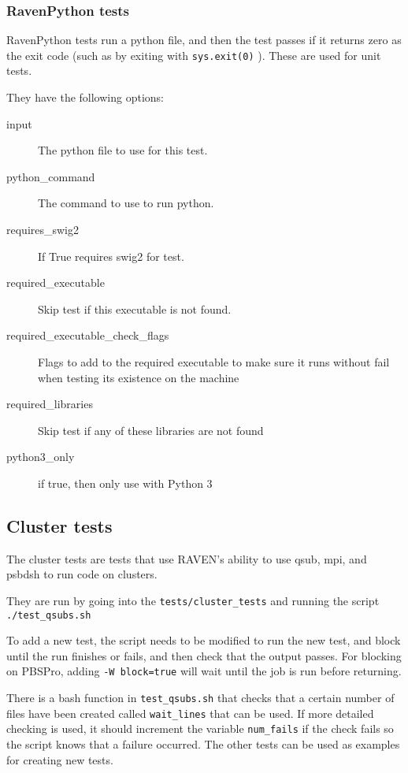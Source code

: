 \documentclass{article}
\begin{document}
\subsubsection{RavenPython tests}

RavenPython tests run a python file, and then the test passes if it
returns zero as the exit code (such as by exiting with
\verb'sys.exit(0)' ).  These are used for unit tests.

They have the following options:

\begin{description}
\item[input] The python file to use for this test.
\item[python\_command] The command to use to run python.
\item[requires\_swig2] If True requires swig2 for test.
\item[required\_executable] Skip test if this executable is not found.
\item[required\_executable\_check\_flags] Flags to add to the required executable to make sure it runs without fail when testing its existence on the machine
\item[required\_libraries] Skip test if any of these libraries are not found
\item[python3\_only] if true, then only use with Python 3
\end{description}

\subsection{Cluster tests}


The cluster tests are tests that use RAVEN's ability to use qsub, mpi,
and psbdsh to run code on clusters.

They are run by going into the \verb'tests/cluster_tests' and running
the script \verb'./test_qsubs.sh'

To add a new test, the script needs to be modified to run the new
test, and block until the run finishes or fails, and then check that
the output passes.  For blocking on PBSPro, adding
\verb'-W block=true' will wait until the job is run before returning.

There is a bash function in \verb'test_qsubs.sh' that checks that a
certain number of files have been created called \verb'wait_lines'
that can be used.  If more detailed checking is used, it should
increment the variable \verb'num_fails' if the check fails so the
script knows that a failure occurred.  The other tests can be used as
examples for creating new tests.
\end{document}

